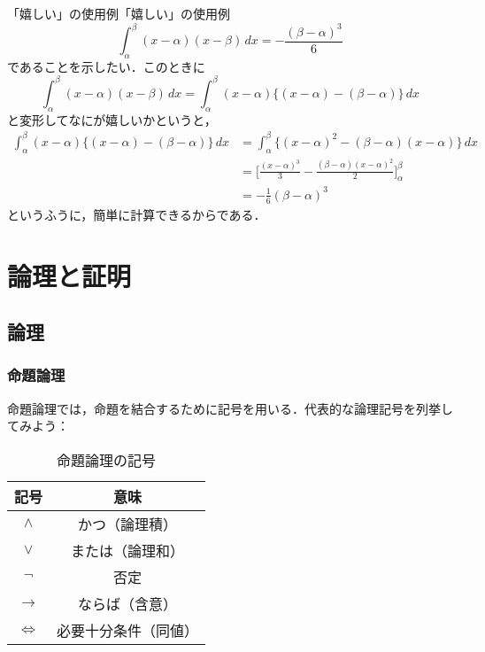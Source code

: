 \documentclass[a4paper,11pt]{ltjsarticle}
\begin{document}
\begin{example}{「嬉しい」の使用例}{「嬉しい」の使用例}
  \[
    \int_{\alpha}^{\beta} (x-\alpha)(x-\beta)\, dx = -\frac{(\beta-\alpha)^3}{6}
  \]
  であることを示したい．このときに
  \[
    \int_{\alpha}^{\beta} (x-\alpha)(x-\beta)\, dx = \int_{\alpha}^{\beta}  (x-\alpha)\{(x-\alpha) - (\beta-\alpha)\} \, dx
  \]
  と変形してなにが嬉しいかというと，
  \begin{align*}
    \int_{\alpha}^{\beta}  (x-\alpha)\{(x-\alpha) - (\beta-\alpha)\} \, dx & = \int_{\alpha}^{\beta} \{  (x-\alpha)^2 -(\beta-\alpha)(x-\alpha) \} \, dx                        \\
                                                                           & = \Biggl [ \frac{(x-\alpha)^3}{3} - \frac{(\beta-\alpha)(x-\alpha)^2}{2} \Biggr ]_{\alpha}^{\beta} \\
                                                                           & = - \frac{1}{6} (\beta-\alpha)^3
  \end{align*}
  というふうに，簡単に計算できるからである．
\end{example}


\newpage

\section{論理と証明}
\subsection{論理}
\subsubsection{命題論理}

命題論理では，命題を結合するために記号を用いる．代表的な論理記号を列挙してみよう：

\begin{table}[ht]
  \centering
  \caption{命題論理の記号}
  \begin{tabular}{c|c}
    \hline
    記号                & 意味                       \\
    \hline
    $\land$           & かつ（論理積\index{ろんりせき@論理積}） \\
    $\lor$            & または（論理和\index{ろんりわ@論理和}） \\
    $\lnot$           & 否定\index{ひてい@否定}         \\
    $\to$             & ならば（含意\index{がんい@含意}）    \\
    $\Leftrightarrow$ & 必要十分条件（同値）\index{どうち@同値} \\
    \hline
  \end{tabular}
\end{table}
\end{document}
